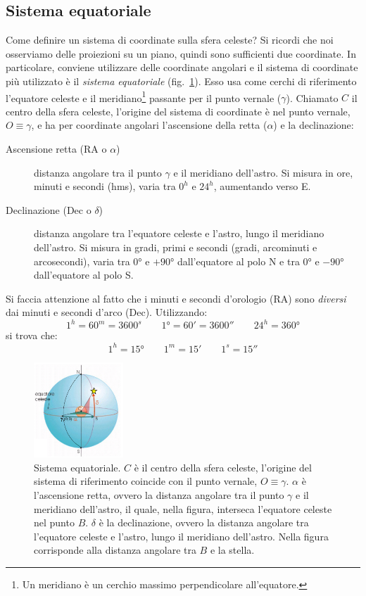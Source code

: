 \subsection{Sistema equatoriale}
Come definire un sistema di coordinate sulla sfera celeste? Si ricordi che noi osserviamo delle proiezioni su un piano, quindi sono sufficienti due coordinate. In particolare, conviene utilizzare delle coordinate angolari e il sistema di coordinate più utilizzato è il \emph{sistema equatoriale} (fig.~\ref{fig:sistema-equatoriale}). Esso usa come cerchi di riferimento l'equatore celeste e il meridiano\footnote{Un meridiano è un cerchio massimo perpendicolare all'equatore.} passante per il punto vernale ($\gamma$). Chiamato $C$ il centro della sfera celeste, l'origine del sistema di coordinate è nel punto vernale, $O \equiv \gamma$, e ha per coordinate angolari l'ascensione della retta ($\alpha$) e la declinazione:
\begin{description}
    \item[Ascensione retta (RA o $\alpha$)] distanza angolare tra il punto $\gamma$ e il meridiano dell'astro. Si misura in ore, minuti e secondi (hms), varia tra $0^h$ e $24^h$, aumentando verso E.
    \item[Declinazione (Dec o $\delta$)] distanza angolare tra l'equatore celeste e l'astro, lungo il meridiano dell'astro. Si misura in gradi, primi e secondi (gradi, arcominuti e arcosecondi), varia tra $\ang{0}$ e $+\ang{90}$ dall'equatore al polo N e tra $\ang{0}$ e $-\ang{90}$ dall'equatore al polo S.
\end{description}
Si faccia attenzione al fatto che i minuti e secondi d'orologio (RA) sono \emph{diversi} dai minuti e secondi d'arco (Dec). Utilizzando:
\[
    1^h = 60^m = 3600^s \qquad \ang{1} = 60' = 3600'' \qquad 24^h = \ang{360}
\]
si trova che:
\[
    1^h = \ang{15} \qquad 1^m = 15' \qquad 1^s = 15''
\]

\begin{figure}
\centering
\includegraphics[width=0.3\textwidth]{immagini/sistema-equatoriale.png}
\caption{Sistema equatoriale. $C$ è il centro della sfera celeste, l'origine del sistema di riferimento coincide con il punto vernale, $O \equiv \gamma$. $\alpha$ è l'ascensione retta, ovvero la distanza angolare tra il punto $\gamma$ e il meridiano dell'astro, il quale, nella figura, interseca l'equatore celeste nel punto $B$. $\delta$ è la declinazione, ovvero la distanza angolare tra l'equatore celeste e l'astro, lungo il meridiano dell'astro. Nella figura corrisponde alla distanza angolare tra $B$ e la stella.}
\label{fig:sistema-equatoriale}
\end{figure}

